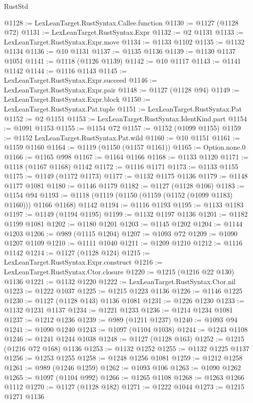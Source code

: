 \begin{lexlean}{RustStd}
\begin{coremodule}
@1128 := LexLeanTarget.RustSyntax.Callee.function
@1130 := @1127 (@1128 @72)
@1131 := LexLeanTarget.RustSyntax.Expr
@1132 := @2 @1131
@1133 := LexLeanTarget.RustSyntax.Expr.move
@1134 := @1133 @1102
@1135 := @1132 @1134
@1136 := @10 @1131
@1137 := @1135 @1136
@1139 := @1130 @1137 @1051
@1141 := @1118 (@1126 @1139)
@1142 := @10 @1117
@1143 := @1141 @1142
@1144 := @1116 @1143
@1145 := LexLeanTarget.RustSyntax.Expr.succeed
@1146 := LexLeanTarget.RustSyntax.Expr.pair
@1148 := @1127 (@1128 @94)
@1149 := LexLeanTarget.RustSyntax.Expr.block
@1150 := LexLeanTarget.RustSyntax.Pat.tuple
@1151 := LexLeanTarget.RustSyntax.Pat
@1152 := @2 @1151
@1153 := LexLeanTarget.RustSyntax.IdentKind.part
@1154 := @1091 @1153
@1155 := @1154 @72
@1157 := @1152 (@1099 @1155)
@1159 := @1152 LexLeanTarget.RustSyntax.Pat.wild
@1160 := @10 @1151
@1161 := @1159 @1160
@1164 := @1119 (@1150 (@1157 @1161))
@1165 := Option.none.{0}
@1166 := @1165 @998
@1167 := @1164 @1166
@1168 := @1133 @1120
@1171 := @1118 (@1167 @1168) @1142
@1172 := @1116 @1171
@1173 := @1133 @1155
@1175 := @1149 (@1172 @1173)
@1177 := @1132 @1175 @1136
@1179 := @1148 @1177 @1081
@1180 := @1146 @1179
@1182 := @1127 (@1128 @106)
@1183 := @1154 @94
@1193 := @1118 (@1119 (@1150 (@1159 (@1152 (@1099 @1183) @1160))) @1166 @1168) @1142
@1194 := @1116 @1193
@1195 := @1133 @1183
@1197 := @1149 (@1194 @1195)
@1199 := @1132 @1197 @1136
@1201 := @1182 @1199 @1081
@1202 := @1180 @1201
@1203 := @1145 @1202
@1204 := @1144 @1203
@1206 := @989 (@1115 @1204)
@1207 := @1093 @72
@1209 := @1090 @1207 @1109
@1210 := @1111 @1040
@1211 := @1209 @1210
@1212 := @1116 @1142
@1214 := @1127 (@1128 @124)
@1215 := LexLeanTarget.RustSyntax.Expr.construct
@1216 := LexLeanTarget.RustSyntax.Ctor.closure
@1220 := @1215 (@1216 @22 @130) @1136
@1221 := @1132 @1220
@1222 := LexLeanTarget.RustSyntax.Ctor.nil
@1223 := @1222 @1037
@1225 := @1215 @1223 @1136
@1226 := @1146 @1225
@1230 := @1127 (@1128 @143) @1136 @1081
@1231 := @1226 @1230
@1233 := @1132 @1231 @1137
@1234 := @1221 @1233
@1236 := @1214 @1234 @1081
@1237 := @1212 @1236
@1239 := @989 (@1211 @1237)
@1240 := @1093 @94
@1241 := @1090 @1240
@1243 := @1097 (@1104 @1038)
@1244 := @1243 @1108
@1246 := @1241 @1244 @1038
@1248 := @1127 (@1128 @163)
@1252 := @1215 (@1216 @72 @168) @1136
@1253 := @1132 @1252
@1255 := @1132 @1225 @1137
@1256 := @1253 @1255
@1258 := @1248 @1256 @1081
@1259 := @1212 @1258
@1261 := @989 (@1246 @1259)
@1262 := @1093 @106
@1263 := @1090 @1262
@1265 := @1097 (@1104 @992)
@1266 := @1265 @1108
@1268 := @1263 @1266 @1112
@1270 := @1127 (@1128 @182)
@1271 := @1222 @1044
@1273 := @1215 @1271 @1136

\end{coremodule}
\end{lexlean}
